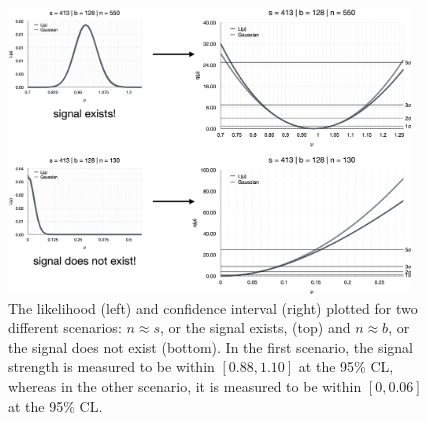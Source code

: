 \begin{figure}[htb]
    \centering
    \includegraphics[width=0.95\textwidth]{fig/stats/CL_examples.png}
    \caption[The likelihood and confidence interval plotted for the ``signal exists'' and ``signal does not exist'' scenarios.]{
        The likelihood (left) and confidence interval (right) plotted for two different scenarios: $n \approx s$, or the signal exists, (top) and $n \approx b$, or the signal does not exist (bottom). 
        In the first scenario, the signal strength is measured to be within $[0.88, 1.10]$ at the 95\% CL, whereas in the other scenario, it is measured to be within $[0, 0.06]$ at the 95\% CL.
    }
    \label{fig:CL_examples}
\end{figure}

